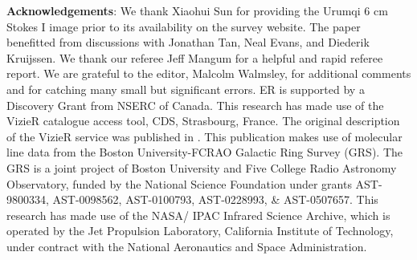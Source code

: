 
% 
% 

\textbf{Acknowledgements}:
We thank Xiaohui Sun for providing the Urumqi 6 cm Stokes I image prior to its
availability on the survey website.  The paper benefitted from discussions
with Jonathan Tan, Neal Evans, and Diederik Kruijssen.
We thank our referee Jeff Mangum for a helpful and rapid referee report.
We are grateful to the editor, Malcolm Walmsley, for additional comments
and for catching many small but significant errors.
ER is supported by a Discovery Grant from NSERC of Canada.
This research has made use of the VizieR catalogue access tool, CDS,
Strasbourg, France. The original description of the VizieR service was
published in \citep{Ochsenbein2000a}.
This publication makes use of molecular line data from the Boston
University-FCRAO Galactic Ring Survey (GRS). The GRS is a joint project of
Boston University and Five College Radio Astronomy Observatory, funded by the
National Science Foundation under grants AST-9800334, AST-0098562, AST-0100793,
AST-0228993, \& AST-0507657.
This research has made use of the NASA/ IPAC Infrared Science Archive, which is
operated by the Jet Propulsion Laboratory, California Institute of Technology,
under contract with the National Aeronautics and Space Administration.


